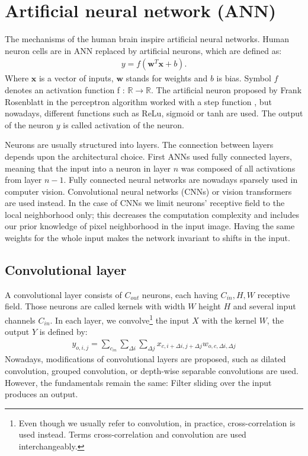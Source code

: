 \section{Artificial neural network (ANN)}
The mechanisms of the human brain inspire artificial neural networks. Human neuron cells are in ANN replaced by artificial neurons, which are defined as:
\begin{align}
    y = f \left( \boldsymbol{w}^T \boldsymbol{x}  + b \right).
\end{align}
Where $\boldsymbol{x}$ is a vector of inputs, $\boldsymbol{w}$ stands for weights and $b$ is bias. Symbol $f$ denotes an activation function f : $\mathbb{R} \rightarrow \mathbb{R}$. The artificial neuron proposed by Frank Rosenblatt in the perceptron algorithm worked with a step function \cite{Rosenblatt1958}, but nowadays, different functions such as ReLu, sigmoid or tanh are used. The output of the neuron $y$ is called activation of the neuron.

Neurons are usually structured into layers. The connection between layers depends upon the architectural choice. First ANNs used fully connected layers, meaning that the input into a neuron in layer $n$ was composed of all activations from layer $n-1$. Fully connected neural networks are nowadays sparsely used in computer vision. Convolutional neural networks (CNNs) or vision transformers are used instead. In the case of CNNs we limit neurons' receptive field to the local neighborhood only; this decreases the computation complexity and includes our prior knowledge of pixel neighborhood in the input image. Having the same weights for the whole input makes the network invariant to shifts in the input.

\subsection{Convolutional layer}
A convolutional layer consists of $C_{out}$ neurons, each having $C_{in}, H, W$ receptive field. Those neurons are called kernels with width $W$ height $H$ and several input channels $C_{in}$. In each layer, we convolve\footnote{Even though we usually refer to convolution, in practice, cross-correlation is used instead. Terms cross-correlation and convolution are used interchangeably.} the input $X$  with the kernel $W$, the output $Y$ is defined by:
\begin{align}
    y_{o,i,j} = \sum_{c_{in}} \sum_{\Delta i} \sum_{\Delta j} x_{c, i+\Delta i, j + \Delta j}  w_{o,c, \Delta i, \Delta j}
\end{align}
Nowadays, modifications of convolutional layers are proposed, such as dilated convolution, grouped convolution, or depth-wise separable convolutions are used. However, the fundamentals remain the same: Filter sliding over the input produces an output.

